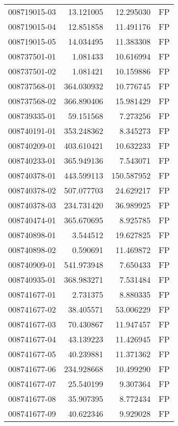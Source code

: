 \begin{tabular}{lrrl}
008719015-03 &   13.121005 &      12.295030 &   FP \\
008719015-04 &   12.851858 &      11.491176 &   FP \\
008719015-05 &   14.034495 &      11.383308 &   FP \\
008737501-01 &    1.081433 &      10.616994 &   FP \\
008737501-02 &    1.081421 &      10.159886 &   FP \\
008737568-01 &  364.030932 &      10.776745 &   FP \\
008737568-02 &  366.890406 &      15.981429 &   FP \\
008739335-01 &   59.151568 &       7.273256 &   FP \\
008740191-01 &  353.248362 &       8.345273 &   FP \\
008740209-01 &  403.610421 &      10.632233 &   FP \\
008740233-01 &  365.949136 &       7.543071 &   FP \\
008740378-01 &  443.599113 &     150.587952 &   FP \\
008740378-02 &  507.077703 &      24.629217 &   FP \\
008740378-03 &  234.731420 &      36.989925 &   FP \\
008740474-01 &  365.670695 &       8.925785 &   FP \\
008740898-01 &    3.544512 &      19.627825 &   FP \\
008740898-02 &    0.590691 &      11.469872 &   FP \\
008740909-01 &  541.973948 &       7.650433 &   FP \\
008740935-01 &  368.983271 &       7.531484 &   FP \\
008741677-01 &    2.731375 &       8.880335 &   FP \\
008741677-02 &   38.405571 &      53.006229 &   FP \\
008741677-03 &   70.430867 &      11.947457 &   FP \\
008741677-04 &   43.139223 &      11.426945 &   FP \\
008741677-05 &   40.239881 &      11.371362 &   FP \\
008741677-06 &  234.928668 &      10.499290 &   FP \\
008741677-07 &   25.540199 &       9.307364 &   FP \\
008741677-08 &   35.907395 &       8.772434 &   FP \\
008741677-09 &   40.622346 &       9.929028 &   FP \\

\end{tabular}

